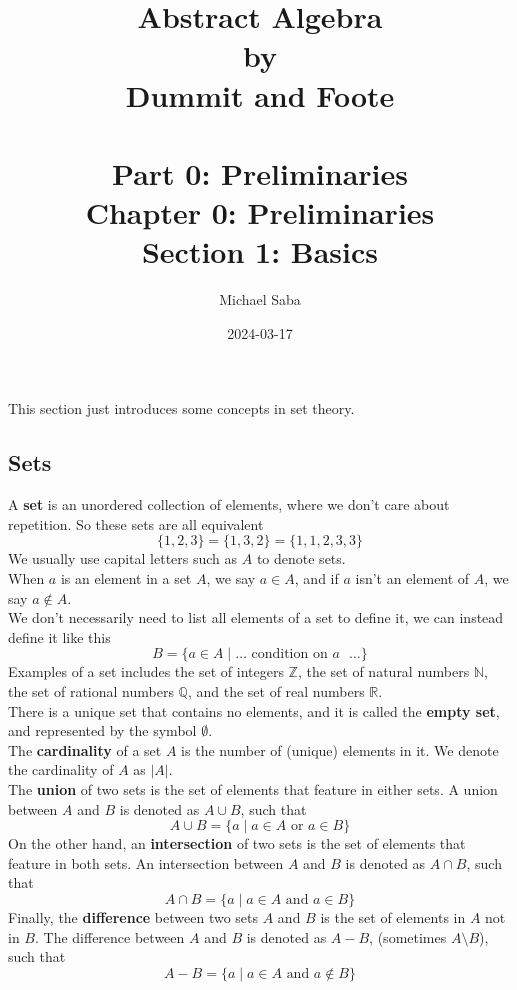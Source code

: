 \documentclass[12pt]{article}
\title{%
    \Huge Abstract Algebra \\
    \large by \\
    \Large Dummit and Foote \\~\\
    \huge Part 0: Preliminaries \\
    \LARGE Chapter 0: Preliminaries \\
    \Large Section 1: Basics
}
\date{2024-03-17}
\author{Michael Saba}
\newcommand{\N}{\mathbb{N}}
\newcommand{\Z}{\mathbb{Z}}
\newcommand{\Q}{\mathbb{Q}}
\newcommand{\R}{\mathbb{R}}
\begin{document}
    \maketitle
    \newpage

    This section just introduces some concepts in set theory. \\

    \subsection*{Sets}

    A \textbf{set} is an unordered collection of elements,
    where we don't care about repetition.
    So these sets are all equivalent
    \[ \{1, 2, 3\} = \{ 1, 3, 2\} = \{ 1, 1, 2, 3, 3 \}  \]
    We usually use capital letters such as $A$ to denote sets. \\
    When $a$ is an element in a set $A$,
    we say $a \in A$, and if $a$ isn't an element of $A$,
    we say $a \notin A$. \\
    We don't necessarily need to list all elements of a set
    to define it, we can instead define it like this
    \[ B = \{ a \in A \mid \dots \text{ condition on $a$ } \dots \} \]
    Examples of a set includes the set of integers $\Z$,
    the set of natural numbers $\N$,
    the set of rational numbers $\Q$,
    and the set of real numbers $\R$. \\

    There is a unique set that contains no elements,
    and it is called the \textbf{empty set},
    and represented by the symbol $\emptyset$. \\
    
    The \textbf{cardinality} of a set $A$ is the number of (unique)
    elements in it.
    We denote the cardinality of $A$ as $|A|$. \\

    The \textbf{union} of two sets is the set of elements
    that feature in either sets.
    A union between $A$ and $B$ is denoted as $A \cup B$, such that
    \[ A \cup B = \{ a \mid a \in A \text{ or } a \in B \} \]
    On the other hand, an \textbf{intersection} of two sets is the set of
    elements that feature in both sets.
    An intersection between $A$ and $B$ is denoted as $A \cap B$, such that
    \[ A \cap B = \{ a \mid a \in A \text{ and } a \in B \} \]
    Finally, the \textbf{difference} between two sets $A$ and $B$
    is the set of elements in $A$ not in $B$.
    The difference between $A$ and $B$ is denoted as $A - B$,
    (sometimes $A \setminus B$), such that
    \[ A - B = \{ a \mid a \in A \text{ and } a \notin B \} \]
    \\
\end{document}
